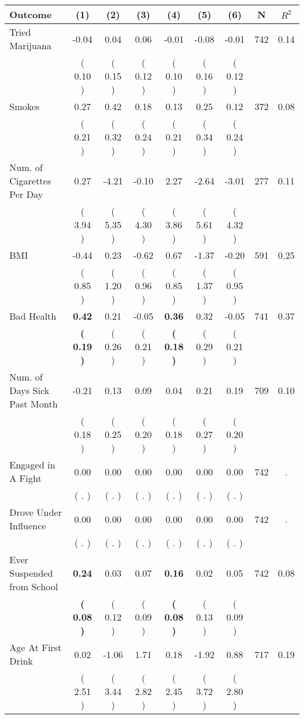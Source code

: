 \begin{tabular}{lcccccccc}
\toprule
 \textbf{Outcome} & \textbf{(1)} & \textbf{(2)} & \textbf{(3)} & \textbf{(4)} & \textbf{(5)} & \textbf{(6)} & \textbf{N} & \textbf{$ R^2$} \\
\midrule
Tried Marijuana &     -0.04 &      0.04 &      0.06 &     -0.01 &     -0.08 &     -0.01 & 742 &       0.14 \\ 
 & (     0.10 ) & (     0.15 ) & (     0.12 ) & (     0.10 ) & (     0.16 ) & (     0.12 ) & \\
Smokes &      0.27 &      0.42 &      0.18 &      0.13 &      0.25 &      0.12 & 372 &       0.08 \\ 
 & (     0.21 ) & (     0.32 ) & (     0.24 ) & (     0.21 ) & (     0.34 ) & (     0.24 ) & \\
Num. of Cigarettes Per Day &      0.27 &     -4.21 &     -0.10 &      2.27 &     -2.64 &     -3.01 & 277 &       0.11 \\ 
 & (     3.94 ) & (     5.35 ) & (     4.30 ) & (     3.86 ) & (     5.61 ) & (     4.32 ) & \\
BMI &     -0.44 &      0.23 &     -0.62 &      0.67 &     -1.37 &     -0.20 & 591 &       0.25 \\ 
 & (     0.85 ) & (     1.20 ) & (     0.96 ) & (     0.85 ) & (     1.37 ) & (     0.95 ) & \\
Bad Health & \textbf{     0.42} &      0.21 &     -0.05 & \textbf{     0.36} &      0.32 &     -0.05 & 741 &       0.37 \\ 
 & \textbf{(     0.19 )} & (     0.26 ) & (     0.21 ) & \textbf{(     0.18 )} & (     0.29 ) & (     0.21 ) & \\
Num. of Days Sick Past Month &     -0.21 &      0.13 &      0.09 &      0.04 &      0.21 &      0.19 & 709 &       0.10 \\ 
 & (     0.18 ) & (     0.25 ) & (     0.20 ) & (     0.18 ) & (     0.27 ) & (     0.20 ) & \\
Engaged in A Fight &      0.00 &      0.00 &      0.00 &      0.00 &      0.00 &      0.00 & 742 &          . \\ 
 & (        . ) & (        . ) & (        . ) & (        . ) & (        . ) & (        . ) & \\
Drove Under Influence &      0.00 &      0.00 &      0.00 &      0.00 &      0.00 &      0.00 & 742 &          . \\ 
 & (        . ) & (        . ) & (        . ) & (        . ) & (        . ) & (        . ) & \\
Ever Suspended from School & \textbf{     0.24} &      0.03 &      0.07 & \textbf{     0.16} &      0.02 &      0.05 & 742 &       0.08 \\ 
 & \textbf{(     0.08 )} & (     0.12 ) & (     0.09 ) & \textbf{(     0.08 )} & (     0.13 ) & (     0.09 ) & \\
Age At First Drink &      0.02 &     -1.06 &      1.71 &      0.18 &     -1.92 &      0.88 & 717 &       0.19 \\ 
 & (     2.51 ) & (     3.44 ) & (     2.82 ) & (     2.45 ) & (     3.72 ) & (     2.80 ) & \\
\bottomrule
\end{tabular}
